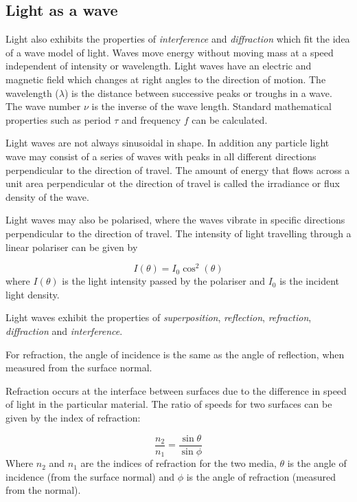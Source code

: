 \subsection{Light as a wave}

Light also exhibits the properties of {\it interference} and {\it diffraction} which fit the idea of a wave model of light. Waves move energy without moving mass at a speed independent of intensity or wavelength. Light waves have an electric and magnetic field which changes at right angles to the direction of motion. The wavelength ($\lambda$) is the distance between successive peaks or troughs in a wave. The wave number $\nu$ is the inverse of the wave length. Standard mathematical properties such as period $\tau$ and frequency $f$ can be calculated. 

Light waves are not always sinusoidal in shape. In addition any particle light wave may consist of a series of waves with peaks in all different directions perpendicular to the direction of travel. The amount of energy that flows across a unit area perpendicular ot the direction of travel is called the irradiance or flux density of the wave. 

Light waves may also be polarised, where the waves vibrate in specific directions perpendicular to the direction of travel. The intensity of light travelling through a linear polariser can be given by 

\begin{equation}
I(\theta) = I_0\cos^2(\theta)
\end{equation}
where $I(\theta)$ is the light intensity passed by the polariser and $I_0$ is the incident light density. 

Light waves exhibit the properties of {\it superposition}, {\it reflection}, {\it refraction}, {\it diffraction} and {\it interference}.

For refraction, the angle of incidence is the same as the angle of reflection, when measured from the surface normal. 

Refraction occurs at the interface between surfaces due to the difference in speed of light in the particular material. The ratio of speeds for two surfaces can be given by the index of refraction:

\begin{equation}
	\frac{n_2}{n_1} = \frac{\sin\theta}{\sin\phi}
\end{equation}
Where $n_2$ and $n_1$ are the indices of refraction for the two media, $\theta$ is the angle of incidence (from the surface normal) and $\phi$ is the angle of refraction (measured from the normal). 

